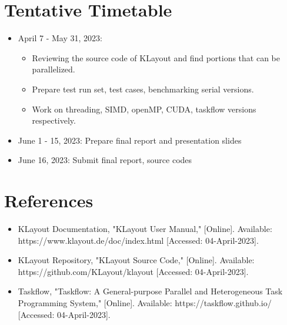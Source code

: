 \documentclass[sigconf]{acmart}
\begin{document}
\section{Tentative Timetable}
\begin{itemize}
    \item April 7 - May 31, 2023: 
    \begin{itemize}
      \item Reviewing the source code of KLayout and find portions that can be parallelized.
      \item Prepare test run set, test cases, benchmarking serial versions.
      \item Work on threading, SIMD, openMP, CUDA, taskflow versions respectively.
    \end{itemize}
    \item June 1 - 15, 2023: Prepare final report and presentation slides
    \item June 16, 2023: Submit final report, source codes
\end{itemize}

\section{References}
\begin{itemize}
  \item KLayout Documentation, "KLayout User Manual," [Online]. Available: https://www.klayout.de/doc/index.html [Accessed: 04-April-2023].
  \item KLayout Repository, "KLayout Source Code," [Online]. Available: https://github.com/KLayout/klayout [Accessed: 04-April-2023].
  \item Taskflow, "Taskflow: A General-purpose Parallel and Heterogeneous Task Programming System," [Online]. Available: https://taskflow.github.io/ [Accessed: 04-April-2023].
\end{itemize}
\end{document}
